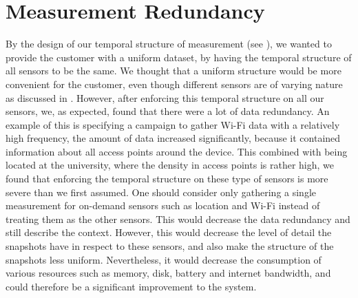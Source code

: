 
\section{Measurement Redundancy}
\label{sec:measurement_redundancy}
By the design of our temporal structure of measurement (see ), we wanted to provide the customer with a uniform dataset, by having the temporal structure of all sensors to be the same. We thought that a uniform structure would be more convenient for the customer, even though different sensors are of varying nature as discussed in . However, after enforcing this temporal structure on all our sensors, we, as expected, found that there were a lot of data redundancy. An example of this is specifying a campaign to gather Wi-Fi data with a relatively high frequency, the amount of data increased significantly, because it contained information about all access points around the device. This combined with being located at the university, where the density in access points is rather high, we found that enforcing the temporal structure on these type of sensors is more severe than we first assumed. One should consider only gathering a single measurement for on-demand sensors such as location and Wi-Fi instead of treating them as the other sensors. This would decrease the data redundancy and still describe the context. However, this would decrease the level of detail the snapshots have in respect to these sensors, and also make the structure of the snapshots less uniform. Nevertheless, it would decrease the consumption of various resources such as memory, disk, battery and internet bandwidth, and could therefore be a significant improvement to the system. 
